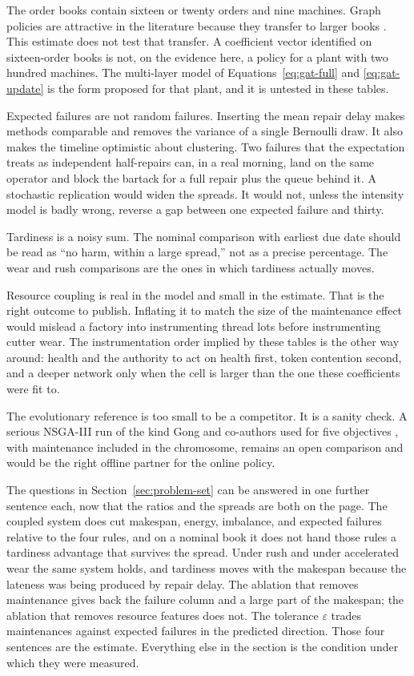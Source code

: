 The order books contain sixteen or twenty orders and nine machines. Graph policies are attractive in the literature because they transfer to larger books \cite{zhang2020,song2023}. This estimate does not test that transfer. A coefficient vector identified on sixteen-order books is not, on the evidence here, a policy for a plant with two hundred machines. The multi-layer model of Equations~\eqref{eq:gat-full} and \eqref{eq:gat-update} is the form proposed for that plant, and it is untested in these tables.

Expected failures are not random failures. Inserting the mean repair delay makes methods comparable and removes the variance of a single Bernoulli draw. It also makes the timeline optimistic about clustering. Two failures that the expectation treats as independent half-repairs can, in a real morning, land on the same operator and block the bartack for a full repair plus the queue behind it. A stochastic replication would widen the spreads. It would not, unless the intensity model is badly wrong, reverse a gap between one expected failure and thirty.

Tardiness is a noisy sum. The nominal comparison with earliest due date should be read as ``no harm, within a large spread,'' not as a precise percentage. The wear and rush comparisons are the ones in which tardiness actually moves.

Resource coupling is real in the model and small in the estimate. That is the right outcome to publish. Inflating it to match the size of the maintenance effect would mislead a factory into instrumenting thread lots before instrumenting cutter wear. The instrumentation order implied by these tables is the other way around: health and the authority to act on health first, token contention second, and a deeper network only when the cell is larger than the one these coefficients were fit to.

The evolutionary reference is too small to be a competitor. It is a sanity check. A serious NSGA-III run of the kind Gong and co-authors used for five objectives \cite{gong2019}, with maintenance included in the chromosome, remains an open comparison and would be the right offline partner for the online policy.

The questions in Section~\ref{sec:problem-set} can be answered in one further sentence each, now that the ratios and the spreads are both on the page. The coupled system does cut makespan, energy, imbalance, and expected failures relative to the four rules, and on a nominal book it does not hand those rules a tardiness advantage that survives the spread. Under rush and under accelerated wear the same system holds, and tardiness moves with the makespan because the lateness was being produced by repair delay. The ablation that removes maintenance gives back the failure column and a large part of the makespan; the ablation that removes resource features does not. The tolerance \(\varepsilon\) trades maintenances against expected failures in the predicted direction. Those four sentences are the estimate. Everything else in the section is the condition under which they were measured.

